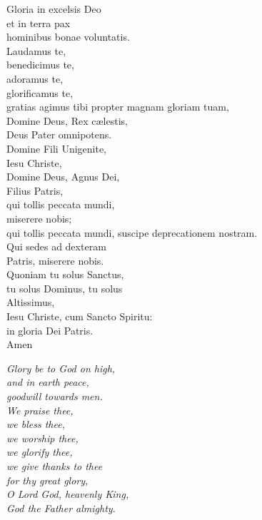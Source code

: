 {\begin{minipage}[t]{.45\textwidth}
	\begin{flushleft}
		Gloria in excelsis Deo\\
et in terra pax\\hominibus bonae voluntatis.\\
Laudamus te,\\
benedicimus te,\\
adoramus te,\\
glorificamus te,\\
gratias agimus tibi propter magnam gloriam tuam,\\
Domine Deus, Rex cælestis,\\
Deus Pater omnipotens.\\
Domine Fili Unigenite,\\Iesu Christe,\\
Domine Deus, Agnus Dei,\\Filius Patris,\\
qui tollis peccata mundi,\\miserere nobis;\\
qui tollis peccata mundi, suscipe deprecationem nostram.\\ Qui sedes ad dexteram\\
Patris, miserere nobis.\\
Quoniam tu solus Sanctus,\\tu solus Dominus, tu solus\\Altissimus,\\ 
Iesu Christe, cum Sancto Spiritu:\\in gloria Dei Patris.\\
Amen
	\end{flushleft}
\end{minipage}\hfill
\begin{minipage}[t]{.5\textwidth}
\begin{flushright}\itshape 
	Glory be to God on high,\\
and in earth peace,\\goodwill towards men.\\
We praise thee,\\
we bless thee,\\
we worship thee,\\
we glorify thee,\\
we give thanks to thee\\for thy great glory,\\
O Lord God, heavenly King,\\God the Father almighty.\\

\end{flushright}
\end{minipage}}
